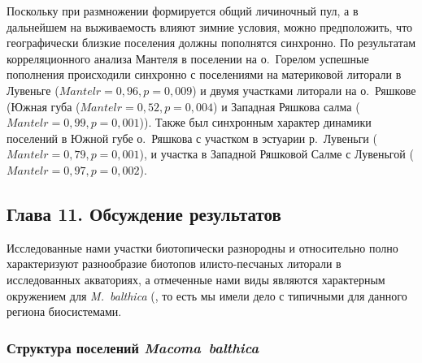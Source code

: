 {Поскольку при размножении формируется общий личиночный пул, а в дальнейшем на выживаемость влияют зимние условия, можно предположить, что географически близкие поселения должны пополнятся синхронно.
По результатам корреляционного анализа Мантеля в поселении на о.~Горелом успешные пополнения происходили синхронно с поселениями на материковой литорали в Лувеньге ($Mantel r = 0,96, p = 0,009$) и двумя участками литорали на о.~Ряшкове (Южная губа ($Mantel r = 0,52, p = 0,004$) и Западная Ряшкова салма ($Mantel r = 0,99, p = 0,001$)).
Также был синхронным характер динамики поселений в Южной губе о.~Ряшкова с участком в эстуарии р.~Лувеньги ($Mantel r = 0,79, p = 0,001$), и участка в Западной Ряшковой Салме с Лувеньгой ($Mantel r = 0,97, p = 0,002$).

\subsection*{Глава 11. Обсуждение результатов}
Исследованные нами участки биотопически разнородны и относительно полно характеризуют разнообразие биотопов илисто-песчаных литорали в исследованных акваториях, а отмеченные нами виды являются характерным окружением для \textit{M.~balthica} (\cite{Derugin_1915, Guryanova_et_al_1928, Guryanova_Ushakov_1929, Guryanova_et_al_1930,Babkov_Golikov_1984, Naumov_Fedyakov_1993, Chertoprud_et_al_2004, Naumov_2006, Gerasimova_et_al_2010, Derevenschikov_Kravets_2010, Stolyarov_2010}, то есть мы имели дело с типичными для данного региона биосистемами.

\subsubsection*{Структура поселений \textit{Macoma~balthica}}
}

